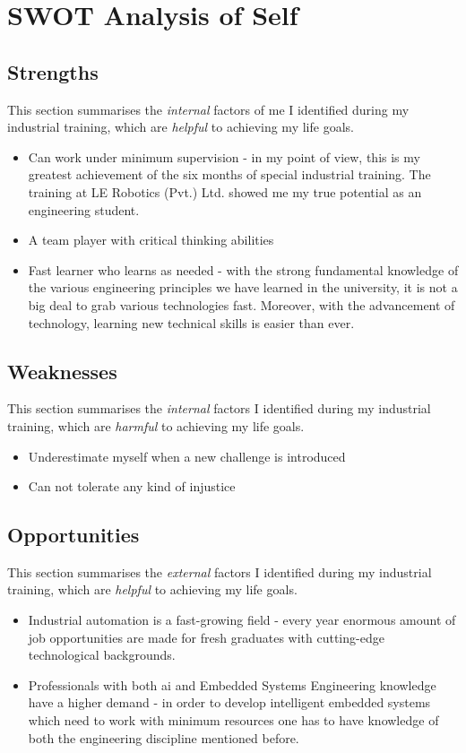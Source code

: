 \documentclass[a4paper,12pt]{report}
\begin{document}
\section{SWOT Analysis of Self}


\subsection{Strengths}

This section summarises the \textit{internal} factors of me I identified during my industrial training, which are \textit{helpful} to achieving my life goals.
\begin{itemize}
	\item Can work under minimum supervision - in my point of view, this is my greatest achievement of the six months of special industrial training. The training at  LE Robotics (Pvt.) Ltd. showed me my true potential as an engineering student.
	
	\item A team player with critical thinking abilities  
	
	\item Fast learner who learns as needed - with the strong fundamental knowledge of the various engineering principles we have learned in the university, it is not a big deal to grab various technologies fast. Moreover, with the advancement of technology, learning new technical skills is easier than ever.
\end{itemize} 


\subsection{Weaknesses}
This section summarises the \textit{internal} factors I identified during my industrial training, which are \textit{harmful} to achieving my life goals.
\begin{itemize}
	\item Underestimate myself when a new 
	challenge is introduced
	\item Can not tolerate any kind of injustice
\end{itemize} 


\subsection{Opportunities}
This section summarises the \textit{external} factors I identified during my industrial training, which are \textit{helpful} to achieving my life goals.
\begin{itemize}
	\item Industrial automation is a fast-growing field - every year enormous amount of job opportunities are made for fresh graduates with cutting-edge technological backgrounds.
	
	\item Professionals with both \ac{ai} and Embedded 
	Systems Engineering knowledge have a 
	higher demand - in order to develop intelligent embedded systems which need to work with minimum resources one has to have knowledge of both the engineering discipline mentioned before.
\end{itemize}
\end{document}
